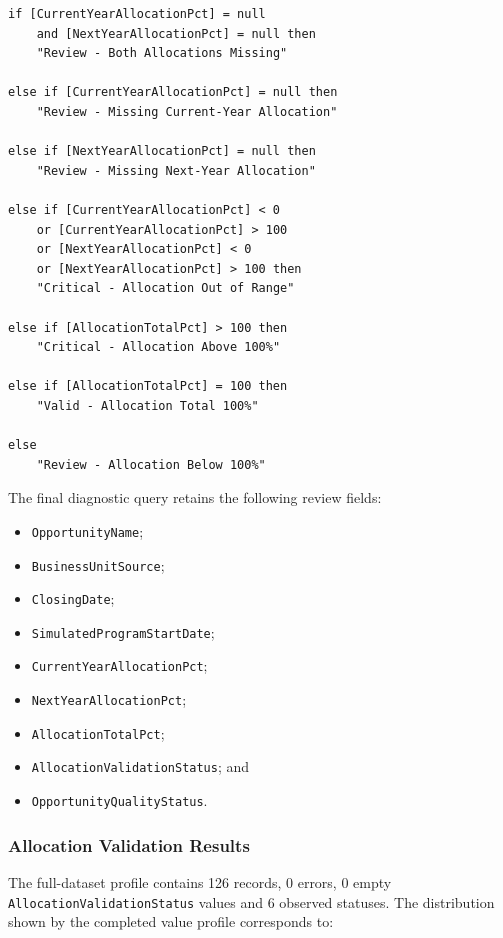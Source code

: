\documentclass[11pt,a4paper]{article}
\begin{document}
\begin{lstlisting}[style=powerquery]
if [CurrentYearAllocationPct] = null
    and [NextYearAllocationPct] = null then
    "Review - Both Allocations Missing"

else if [CurrentYearAllocationPct] = null then
    "Review - Missing Current-Year Allocation"

else if [NextYearAllocationPct] = null then
    "Review - Missing Next-Year Allocation"

else if [CurrentYearAllocationPct] < 0
    or [CurrentYearAllocationPct] > 100
    or [NextYearAllocationPct] < 0
    or [NextYearAllocationPct] > 100 then
    "Critical - Allocation Out of Range"

else if [AllocationTotalPct] > 100 then
    "Critical - Allocation Above 100%"

else if [AllocationTotalPct] = 100 then
    "Valid - Allocation Total 100%"

else
    "Review - Allocation Below 100%"
\end{lstlisting}

The final diagnostic query retains the following review fields:

\begin{itemize}[leftmargin=7mm,itemsep=2pt]
    \item \texttt{OpportunityName};
    \item \texttt{BusinessUnitSource};
    \item \texttt{ClosingDate};
    \item \texttt{SimulatedProgramStartDate};
    \item \texttt{CurrentYearAllocationPct};
    \item \texttt{NextYearAllocationPct};
    \item \texttt{AllocationTotalPct};
    \item \texttt{AllocationValidationStatus}; and
    \item \texttt{OpportunityQualityStatus}.
\end{itemize}

\subsubsection*{Allocation Validation Results}

The full-dataset profile contains 126 records, 0 errors, 0 empty
\texttt{AllocationValidationStatus} values and 6 observed statuses. The
distribution shown by the completed value profile corresponds to:
\end{document}
